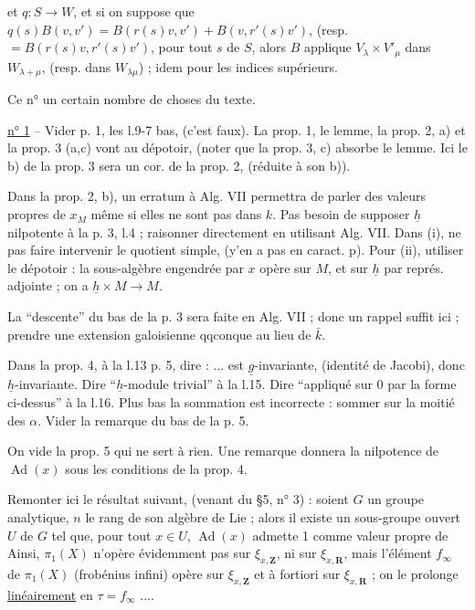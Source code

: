 et $q:S\longrightarrow W$, et si on suppose que $q(s)B(v,v')=B(r(s)v,v')+B(v,r'(s)v')$, (resp. $=B(r(s)v,r'(s)v')$, pour tout $s$ de $S$, alors $B$ applique $V_\lambda\times V'_\mu$ dans $W_{\lambda+\mu}$, (resp. dans $W_{\lambda\mu}$) ; idem pour les indices supérieurs.

Ce n°  un certain nombre de choses du texte.

\uline{n° 1} -- Vider p. 1, les l.9-7 bas, (c'est faux). La prop. 1, le lemme, la prop. 2, a) et la prop. 3 (a,c) vont au dépotoir, (noter que la prop. 3, c) absorbe le lemme. Ici le b) de la prop. 3 sera un cor. de la prop. 2, (réduite à son b)).

Dans la prop. 2, b), un erratum à Alg. VII permettra de parler des valeurs propres de $x_M$ même si elles ne sont pas dans $k$. Pas besoin de supposer $\underline h$ nilpotente à la p. 3, l.4 ; raisonner directement en utilisant Alg. VII. Dans (i), ne pas faire intervenir le quotient simple, (y'en a pas en caract. p). Pour (ii), utiliser le dépotoir : la sous-algèbre engendrée par $x$ opère sur $M$, et sur $\underline h$ par représ. adjointe ; on a $\underline h\times M\longrightarrow M$.

La ``descente'' du bas de la p. 3 sera faite en Alg. VII ; donc un rappel suffit ici ; prendre une extension galoisienne qqconque au lieu de $\bar k$.

Dans la prop. 4, à la l.13 p. 5, dire : ... est $\underline g$-invariante, (identité de Jacobi), donc $\underline h$-invariante. Dire ``$\underline h$-module trivial'' à la l.15. Dire ``appliqué sur 0 par la forme ci-dessus'' à la l.16. Plus bas la sommation est incorrecte : sommer sur la moitié des $\alpha$. Vider la remarque du bas de la p. 5.

On vide la prop. 5 qui ne sert à rien. Une remarque donnera la nilpotence de $\operatorname{Ad}(x)$ sous les conditions de la prop. 4.

Remonter ici le résultat suivant, (venant du \S 5, n° 3) : soient $G$ un groupe analytique, $n$ le rang de son algèbre de Lie ; alors il existe un sous-groupe ouvert $U$ de $G$ tel que, pour tout $x\in U$, $\operatorname{Ad}(x)$ admette 1 comme valeur propre de
Ainsi, $\pi_1(X)$ n'opère évidemment pas sur $\xi_{x,\mathbf Z}$, ni  sur $\xi_{x,\mathbf R}$, mais l'élément $f_\infty$ de $\pi_1(X)$ (frobénius infini) opère sur $\xi_{x,\mathbf Z}$ et à fortiori sur $\xi_{x,\mathbf R}$ ; on le prolonge \uline{linéairement} en $\tau=f_\infty$ ....

